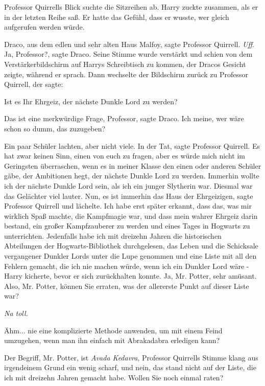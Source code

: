 Professor Quirrells Blick suchte die Sitzreihen ab. Harry zuckte zusammen, als
er in der letzten Reihe saß. Er hatte das Gefühl, dass er wusste, wer gleich
aufgerufen werden würde.

\glqq{}Draco, aus dem edlen und sehr alten Haus Malfoy\grqq{}, sagte Professor
Quirrell. \emph{Uff}. \glqq{}Ja, Professor?\grqq{}, sagte Draco. Seine Stimme
wurde verstärkt und schien von dem Verstärkerbildschirm auf Harrys Schreibtisch
zu kommen, der Dracos Gesicht zeigte, während er sprach. Dann wechselte der
Bildschirm zurück zu Professor Quirrell, der sagte:

\glqq{}Ist es Ihr Ehrgeiz, der nächste Dunkle Lord zu werden?\grqq{}

\glqq{}Das ist eine merkwürdige Frage, Professor\grqq{}, sagte Draco. \glqq{}Ich
meine, wer wäre schon so dumm, das zuzugeben?\grqq{}

Ein paar Schüler lachten, aber nicht viele. \glqq{}In der Tat\grqq{}, sagte
Professor Quirrell. \glqq{}Es hat zwar keinen Sinn, einen von euch zu fragen,
aber es würde mich nicht im Geringsten überraschen, wenn es in meiner Klasse den
einen oder anderen Schüler gäbe, der Ambitionen hegt, der nächste Dunkle Lord zu
werden. Immerhin wollte ich der nächste Dunkle Lord sein, als ich ein junger
Slytherin war.\grqq{} Diesmal war das Gelächter viel lauter. \glqq{}Nun, es ist
immerhin das Haus der Ehrgeizigen\grqq{}, sagte Professor Quirrell und lächelte.
\glqq{}Ich habe erst später erkannt, dass das, was mir wirklich Spaß machte, die
Kampfmagie war, und dass mein wahrer Ehrgeiz darin bestand, ein großer
Kampfzauberer zu werden und eines Tages in Hogwarts zu unterrichten. Jedenfalls
habe ich mit dreizehn Jahren die historischen Abteilungen der
Hogwarts-Bibliothek durchgelesen, das Leben und die Schicksale vergangener
Dunkler Lords unter die Lupe genommen und eine Liste mit all den Fehlern
gemacht, die ich nie machen würde, wenn ich ein Dunkler Lord wäre -\grqq{} Harry
kicherte, bevor er sich zurückhalten konnte. \glqq{}Ja, Mr. Potter, sehr amüsant.
Also, Mr. Potter, können Sie erraten, was der allererste Punkt auf dieser Liste
war?\grqq{}

\emph{Na toll.}

\glqq{}Ähm... nie eine komplizierte Methode anwenden, um mit einem Feind
umzugehen, wenn man ihn einfach mit Abrakadabra erledigen kann?\grqq{}

\glqq{}Der Begriff, Mr. Potter, ist \emph{Avada Kedavra}\grqq{}, Professor
Quirrells Stimme klang aus irgendeinem Grund ein wenig scharf, \glqq{}und nein,
das stand nicht auf der Liste, die ich mit dreizehn Jahren gemacht habe. Wollen
Sie noch einmal raten?\grqq{}

